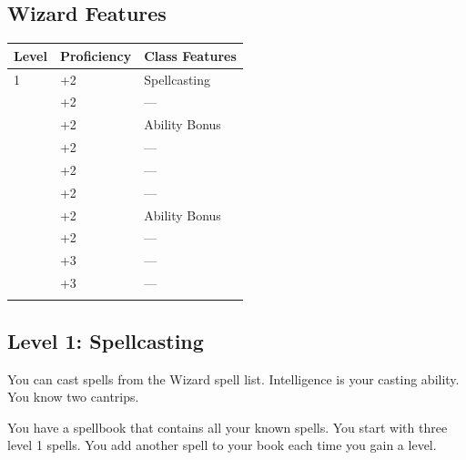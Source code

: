 \documentclass[12pt,letterpaper,twocolumn,openany,nodeprecatedcode,bg=none]{dndbook}
\let\oldsubsection\subsection
\renewcommand{\subsection}[1]{%
  \needspace{5\baselineskip}%
  \oldsubsection{#1}%
}
\begin{document}
\subsection{Wizard Features}\label{wizard-features}


{\def\LTcaptype{none} %
\begin{table}[!htbp]
\centering
\begin{tabular}{@{}
  >{\raggedright\arraybackslash}p{}
  >{\raggedright\arraybackslash}p{}
  >{\raggedright\arraybackslash}p{}@{}}
\toprule\noalign{}
\begin{minipage}[b]{\linewidth}\raggedright
Level
\end{minipage} & \begin{minipage}[b]{\linewidth}\raggedright
Proficiency
\end{minipage} & \begin{minipage}[b]{\linewidth}\raggedright
Class Features
\end{minipage} \\
\midrule\noalign{}
1 & +2 & Spellcasting \\
2 & +2 & --- \\
3 & +2 & Ability Bonus \\
4 & +2 & --- \\
5 & +2 & --- \\
6 & +2 & --- \\
7 & +2 & Ability Bonus \\
8 & +2 & --- \\
9 & +3 & --- \\
10 & +3 & --- \\
\bottomrule\noalign{}
\end{tabular}
\end{table}
}

\subsection{Level 1: Spellcasting}\label{level-1-spellcasting}

You can cast spells from the Wizard spell list. Intelligence is your
casting ability. You know two cantrips.

You have a spellbook that contains all your known spells. You start with
three level 1 spells. You add another spell to your book each time you
gain a level.
\end{document}
